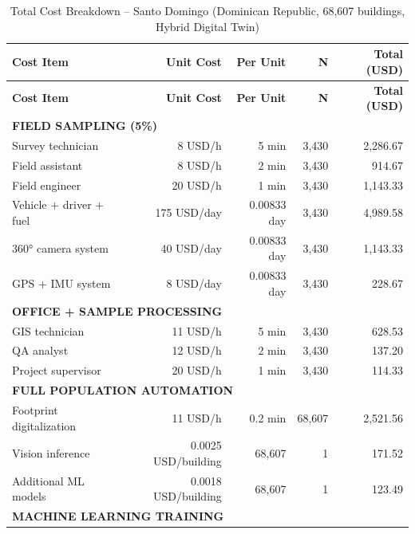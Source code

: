 \begin{longtable}{lrrrr}
\caption{Total Cost Breakdown – Santo Domingo (Dominican Republic, 68,607 buildings, Hybrid Digital Twin)} \\
\hline
\textbf{Cost Item} & \textbf{Unit Cost} & \textbf{Per Unit} & \textbf{N} & \textbf{Total (USD)} \\
\hline
\endfirsthead

\hline
\textbf{Cost Item} & \textbf{Unit Cost} & \textbf{Per Unit} & \textbf{N} & \textbf{Total (USD)} \\
\hline
\endhead

\multicolumn{5}{l}{\textbf{FIELD SAMPLING (5\%)}} \\

Survey technician & 8 USD/h & 5 min & 3,430 & 2,286.67 \\
Field assistant & 8 USD/h & 2 min & 3,430 & 914.67 \\
Field engineer & 20 USD/h & 1 min & 3,430 & 1,143.33 \\
Vehicle + driver + fuel & 175 USD/day & 0.00833 day & 3,430 & 4,989.58 \\
360° camera system & 40 USD/day & 0.00833 day & 3,430 & 1,143.33 \\
GPS + IMU system & 8 USD/day & 0.00833 day & 3,430 & 228.67 \\
\hline

\multicolumn{5}{l}{\textbf{OFFICE + SAMPLE PROCESSING}} \\

GIS technician & 11 USD/h & 5 min & 3,430 & 628.53 \\
QA analyst & 12 USD/h & 2 min & 3,430 & 137.20 \\
Project supervisor & 20 USD/h & 1 min & 3,430 & 114.33 \\
\hline

\multicolumn{5}{l}{\textbf{FULL POPULATION AUTOMATION}} \\

Footprint digitalization & 11 USD/h & 0.2 min & 68,607 & 2,521.56 \\
Vision inference & 0.0025 USD/building & 68,607 & 1 & 171.52 \\
Additional ML models & 0.0018 USD/building & 68,607 & 1 & 123.49 \\
\hline

\multicolumn{5}{l}{\textbf{MACHINE LEARNING TRAINING}} \\


\end{longtable}
